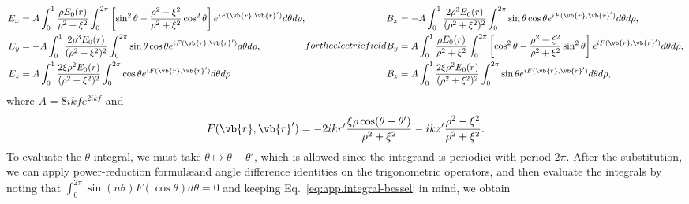 \documentclass[11pt,SymmetricalJury]{inrsthesis/inrsthesis}
\begin{document}
  \begin{subequations}
  \begin{align}
    E_x      &= A\int_0^{1}\frac{\rho E_0(r)}{\rho^2+\xi^2}\int_0^{2\pi}
        \left[\sin^2\theta-\frac{\rho^2-\xi^2}{\rho^2+\xi^2}\cos^2\theta\right]
        e^{iF(\vb{r},\vb{r}')}d\theta d\rho, \\
    E_y     &= -A\int_0^{1}\frac{2\rho^3 E_0(r)}{(\rho^2+\xi^2)^2}\int_0^{2\pi}
        \sin\theta\cos\theta
        e^{iF(\vb{r},\vb{r}')}d\theta d\rho, \\
    E_z     &= A\int_0^{1}\frac{2\xi\rho^2E_0(r)}{(\rho^2+\xi^2)^2}\int_0^{2\pi}
        \cos\theta e^{iF(\vb{r},\vb{r}')}d\theta d\rho
  \end{align}
for the electric field
  \begin{align}
    B_x       &=-A\int_0^{1}\frac{2\rho^3 E_0(r)}{(\rho^2+\xi^2)^2}\int_0^{2\pi}
        \sin\theta\cos\theta
        e^{iF(\vb{r},\vb{r}')}d\theta d\rho, \\
    B_y        &= A\int_0^{1}\frac{\rho E_0(r)}{\rho^2+\xi^2}\int_0^{2\pi}
        \left[\cos^2\theta-\frac{\rho^2-\xi^2}{\rho^2+\xi^2}\sin^2\theta\right]
        e^{iF(\vb{r},\vb{r}')}d\theta d\rho,\\
    B_z       &= A\int_0^{1}\frac{2\xi\rho^2 E_0(r)}{(\rho^2+\xi^2)^2}\int_0^{2\pi}
        \sin\theta e^{iF(\vb{r},\vb{r}')}d\theta d\rho,
  \end{align}
  \end{subequations}
where $A=8ikfe^{2ikf}$ and
  \begin{equation}
    F(\vb{r},\vb{r}') = -2ikr'\frac{\xi\rho\cos(\theta-\theta')}{\rho^2+\xi^2}
                        -ikz'\frac{\rho^2-\xi^2}{\rho^2+\xi^2}.
  \end{equation}
To evaluate the $\theta$ integral, we must take $\theta\mapsto\theta-\theta'$,
which is allowed since the integrand is periodici with period $2\pi$. After the
substitution, we can apply power-reduction formul\ae and angle difference identities
on the trigonometric operators, and then evaluate the integrals by noting
that $\int_0^{2\pi}\sin(n\theta)F(\cos\theta)d\theta=0$ and keeping
Eq.~\eqref{eq:app.integral-bessel} in mind, we obtain
\end{document}
